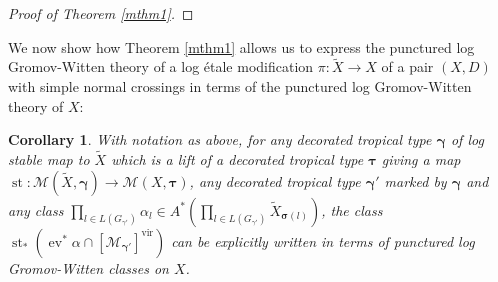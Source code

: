 \documentclass[12pt, oneside]{amsart}   	%
\newcounter{thm}
\newtheorem{corollary}[thm]{Corollary}
\newcommand{\vir}{\operatorname{vir}}
\newcommand{\ev}{\operatorname{ev}}
\newcommand{\st}{\operatorname{st}}
\numberwithin{equation}{section}
\numberwithin{thm}{section}
\numberwithin{figure}{section}
\begin{document}
\begin{proof}[Proof of Theorem \ref{mthm1}]

\end{proof}


We now show how Theorem \ref{mthm1} allows us to express the punctured log Gromov-Witten theory of a log \'etale modification $\pi: \widetilde{X} \rightarrow X$ of a pair $(X,D)$ with simple normal crossings in terms of the punctured log Gromov-Witten theory of $X$: 


\begin{corollary}\label{reduce}
With notation as above, for any decorated tropical type $\pmb\gamma$ of log stable map to $\widetilde{X}$ which is a lift of a decorated tropical type $\pmb\tau$ giving a map $\st: \mathscr{M}(\widetilde{X},\pmb\gamma) \rightarrow \mathscr{M}(X,\pmb\tau)$, any decorated tropical type $\pmb\gamma'$ marked by $\pmb\gamma$ and any class $\prod_{l \in L(G_{\gamma'})}\alpha_l \in A^*(\prod_{l \in L(G_{\gamma'})} \widetilde{X}_{\pmb\sigma(l)})$, the class $\st_*(\ev^*\alpha\cap[\mathscr{M}_{\pmb\gamma'}]^{\vir})$ can be explicitly written in terms of punctured log Gromov-Witten classes on $X$. 
\end{corollary}
\end{document}
